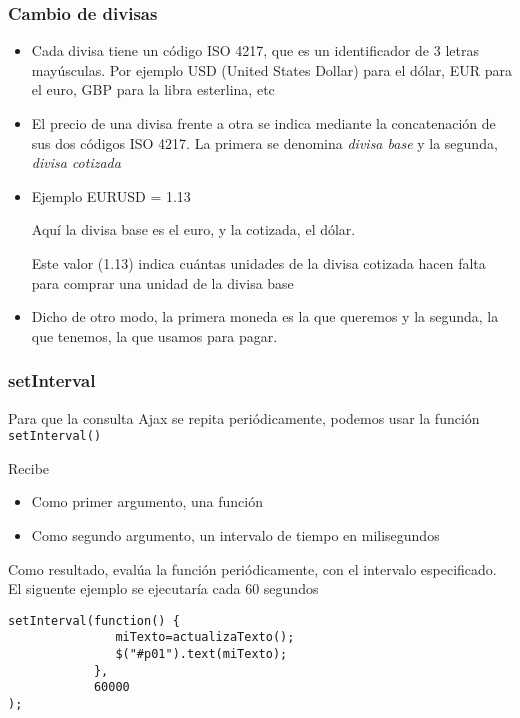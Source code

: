 \documentclass[ucs]{beamer}
\begin{document}
\begin{frame}[fragile]
\frametitle{Cambio de divisas}
\begin{itemize}
\item
Cada divisa tiene un código ISO 4217, que es un identificador de 3 letras mayúsculas.
Por ejemplo USD (United States Dollar) para el dólar, EUR para el euro, GBP para la libra esterlina,
etc

\item
El precio de una divisa frente a otra se indica mediante la concatenación de sus dos códigos ISO 4217.
La primera se denomina \emph{divisa base}
y la segunda,
\emph{divisa cotizada}

\item
Ejemplo EURUSD = 1.13

Aquí la divisa base es el euro, y la cotizada, el dólar. 

Este valor (1.13) indica cuántas
unidades de la divisa cotizada hacen falta para
comprar una unidad de la divisa base 

\item
Dicho de otro modo, la primera moneda es la que queremos
y la segunda, la que tenemos, la que usamos para pagar.

\end{itemize}
\end{frame}




\begin{frame}[fragile]
\frametitle{setInterval}

Para que la consulta Ajax se repita periódicamente, podemos
usar la función 
\verb|setInterval()|

Recibe
\begin{itemize}
\item
Como primer argumento, una función

\item
Como segundo argumento, un intervalo de tiempo en milisegundos

\end{itemize}

Como resultado, evalúa la función periódicamente, con el intervalo
especificado.
El siguente ejemplo se ejecutaría cada 60 segundos

  \begin{scriptsize}
  \begin{verbatim}
setInterval(function() { 
               miTexto=actualizaTexto();
               $("#p01").text(miTexto);
            }, 
            60000
);
  \end{verbatim}
  \end{scriptsize}

\end{frame}
\end{document}

